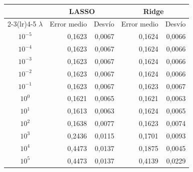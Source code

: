 \begin{tabular}{crrrr}
\toprule
 & \multicolumn{2}{c}{LASSO} & \multicolumn{2}{c}{Ridge} \\
\cmidrule(lr){2-3}\cmidrule(lr){4-5}
$\lambda$ & Error medio & Desvío & Error medio & Desvío \\
\midrule
$10^{-5}$ & 0,1623 & 0,0067 & 0,1624 & 0,0066 \\
$10^{-4}$ & 0,1623 & 0,0067 & 0,1624 & 0,0066 \\
$10^{-3}$ & 0,1623 & 0,0067 & 0,1624 & 0,0066 \\
$10^{-2}$ & 0,1623 & 0,0067 & 0,1624 & 0,0066 \\
$10^{-1}$ & 0,1623 & 0,0067 & 0,1623 & 0,0067 \\
$10^{0}$ & 0,1621 & 0,0065 & 0,1621 & 0,0063 \\
$10^{1}$ & 0,1613 & 0,0063 & 0,1624 & 0,0065 \\
$10^{2}$ & 0,1638 & 0,0077 & 0,1623 & 0,0074 \\
$10^{3}$ & 0,2436 & 0,0115 & 0,1701 & 0,0093 \\
$10^{4}$ & 0,4473 & 0,0137 & 0,1875 & 0,0045 \\
$10^{5}$ & 0,4473 & 0,0137 & 0,4139 & 0,0229 \\
\bottomrule
\end{tabular}
